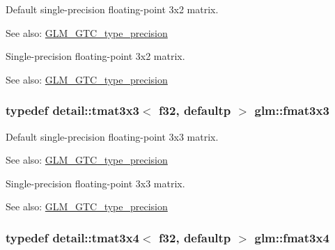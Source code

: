 Default single-precision floating-point 3x2 matrix. \begin{Desc}
\item[See also:]\hyperlink{group__gtc__type__precision}{GLM\_\-GTC\_\-type\_\-precision}\end{Desc}
Single-precision floating-point 3x2 matrix. \begin{Desc}
\item[See also:]\hyperlink{group__gtc__type__precision}{GLM\_\-GTC\_\-type\_\-precision} \end{Desc}
\hypertarget{group__gtc__type__precision_gfa6841eaaa5ee45de1d892c26b349571}{
\subsubsection[fmat3x3]{\setlength{\rightskip}{0pt plus 5cm}typedef detail::tmat3x3$<$ f32, defaultp $>$ {\bf glm::fmat3x3}}}
\label{group__gtc__type__precision_gfa6841eaaa5ee45de1d892c26b349571}


Default single-precision floating-point 3x3 matrix. \begin{Desc}
\item[See also:]\hyperlink{group__gtc__type__precision}{GLM\_\-GTC\_\-type\_\-precision}\end{Desc}
Single-precision floating-point 3x3 matrix. \begin{Desc}
\item[See also:]\hyperlink{group__gtc__type__precision}{GLM\_\-GTC\_\-type\_\-precision} \end{Desc}
\hypertarget{group__gtc__type__precision_g87084a1f4d6e8dd94f719029840dbafc}{
\subsubsection[fmat3x4]{\setlength{\rightskip}{0pt plus 5cm}typedef detail::tmat3x4$<$ f32, defaultp $>$ {\bf glm::fmat3x4}}}
\label{group__gtc__type__precision_g87084a1f4d6e8dd94f719029840dbafc}


